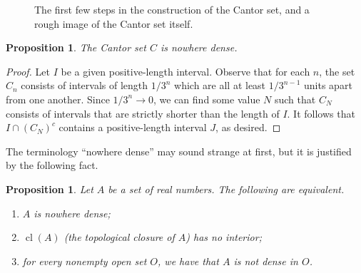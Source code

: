 \documentclass[11pt,oneside]{amsbook}
\DeclareMathOperator{\cl}{cl}
\theoremstyle{definition}
\theoremstyle{plain}
\newtheorem{proposition}[theorem]{Proposition}
\theoremstyle{definition}
\theoremstyle{remark}
\numberwithin{equation}{section}
\numberwithin{figure}{section}
\begin{document}
\begin{figure}[h]
\begin{center}
\end{center}
\caption{The first few steps in the construction of the Cantor set, and a rough image of the Cantor set itself.\label{fig:cantor-set}}
\end{figure}

\begin{proposition}
  The Cantor set $C$ is nowhere dense.
\end{proposition}

\begin{proof}
  Let $I$ be a given positive-length interval. Observe that for each $n$, the set $C_n$ consists of intervals of length $1/3^n$ which are all at least $1/3^{n-1}$ units apart from one another. Since $1/3^n\to0$, we can find some value $N$ such that $C_N$ consists of intervals that are strictly shorter than the length of $I$. It follows that $I\cap (C_N)^c$ contains a positive-length interval $J$, as desired.
\end{proof}

The terminology ``nowhere dense'' may sound strange at first, but it is justified by the following fact.

\begin{proposition}
  \label{prop:nwd-equiv}
  Let $A$ be a set of real numbers. The following are equivalent.
  \begin{enumerate}
    \item $A$ is nowhere dense;
    \item $\cl(A)$ (the topological closure of $A$) has no interior;
    \item for every nonempty open set $O$, we have that $A$ is not dense in $O$.
  \end{enumerate}
\end{proposition}
\end{document}
